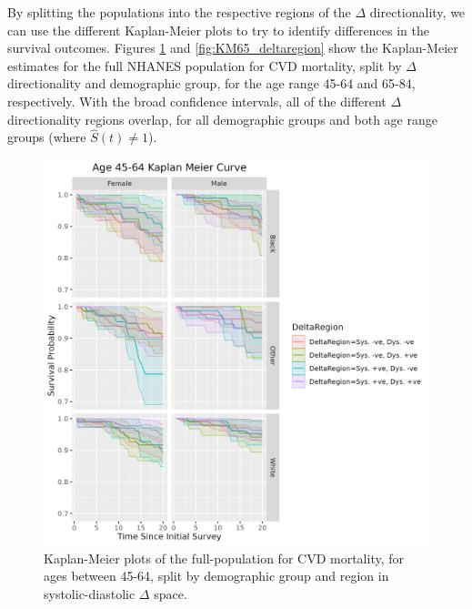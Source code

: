\documentclass[
]{article}
\begin{document}
By splitting the populations into the respective regions of the \(\Delta\) directionality, we can use the different Kaplan-Meier plots to try to identify differences in the survival outcomes. Figures \ref{fig:KM45_deltaregion} and \ref{fig:KM65_deltaregion} show the Kaplan-Meier estimates for the full NHANES population for CVD mortality, split by \(\Delta\) directionality and demographic group, for the age range 45-64 and 65-84, respectively. With the broad confidence intervals, all of the different \(\Delta\) directionality regions overlap, for all demographic groups and both age range groups (where \(\hat{S}(t)\neq 1\)).

\begin{figure}
\centering
\includegraphics{./Rmarkdown_Plots/SurvProbKM_Delta_45-65.png}
\caption{Kaplan-Meier plots of the full-population for CVD mortality, for ages between 45-64, split by demographic group and region in systolic-diastolic \(\Delta\) space.}\label{fig:KM45_deltaregion}
\end{figure}
\end{document}
